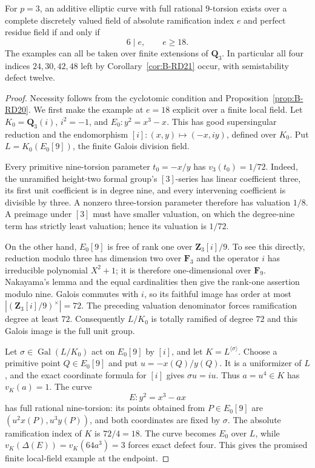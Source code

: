 \begin{theorem}
\label{thm:B-RD23}
For $p=3$, an additive elliptic curve with full rational $9$-torsion
exists over a complete discretely valued field of absolute
ramification index $e$ and perfect residue field if and only if
\[
                              6\mid e,\qquad e\geq18.
                                                        \tag{B-RD23.1}
\]
The examples can all be taken over finite extensions of $\mathbf Q_3$.
In particular all four indices $24,30,42,48$ left by
Corollary~\ref{cor:B-RD21} occur, with semistability defect twelve.
\end{theorem}
\begin{proof}
Necessity follows from the cyclotomic condition and
Proposition~\ref{prop:B-RD20}. We first make the example at $e=18$
explicit over a finite local field. Let $K_0=\mathbf Q_3(i)$,
$i^2=-1$, and $E_0:y^2=x^3-x$. This has good supersingular
reduction and the endomorphism
$[i]:(x,y)\mapsto(-x,iy)$, defined over $K_0$. Put
$L=K_0(E_0[9])$, the finite Galois division field.

Every primitive nine-torsion parameter $t_0=-x/y$ has
$v_3(t_0)=1/72$. Indeed, the unramified height-two formal group's
$[3]$-series has linear coefficient three, its first unit
coefficient is in degree nine, and every intervening coefficient
is divisible by three. A nonzero three-torsion parameter therefore
has valuation $1/8$. A preimage under $[3]$ must have smaller
valuation, on which the degree-nine term has strictly least
valuation; hence its valuation is $1/72$.

On the other hand, $E_0[9]$ is free of rank one over
$\mathbf Z_3[i]/9$. To see this directly, reduction modulo three
has dimension two over $\mathbf F_3$ and the operator $i$ has
irreducible polynomial $X^2+1$; it is therefore one-dimensional
over $\mathbf F_9$. Nakayama's lemma and the equal cardinalities
then give the rank-one assertion modulo nine. Galois commutes
with $i$, so its faithful image has order at most
$|(\mathbf Z_3[i]/9)^\times|=72$. The preceding valuation
denominator forces ramification degree at least $72$.
Consequently $L/K_0$ is totally ramified of degree $72$ and this
Galois image is the full unit group.

Let $\sigma\in\operatorname{Gal}(L/K_0)$ act on $E_0[9]$ by $[i]$,
and let $K=L^{\langle\sigma\rangle}$. Choose a primitive point
$Q\in E_0[9]$ and put $u=-x(Q)/y(Q)$. It is a uniformizer of
$L$, and the exact coordinate formula for $[i]$ gives
$\sigma u=iu$. Thus $a=u^4\in K$ has $v_K(a)=1$. The curve
\[
                         E:y^2=x^3-ax
\]
has full rational nine-torsion: its points obtained from
$P\in E_0[9]$ are $(u^2x(P),u^3y(P))$, and both coordinates are
fixed by $\sigma$. The absolute ramification index of $K$ is
$72/4=18$. The curve becomes $E_0$ over $L$, while
$v_K(\Delta(E))=v_K(64a^3)=3$ forces exact defect four. This gives
the promised finite local-field example at the endpoint.


\end{proof}
